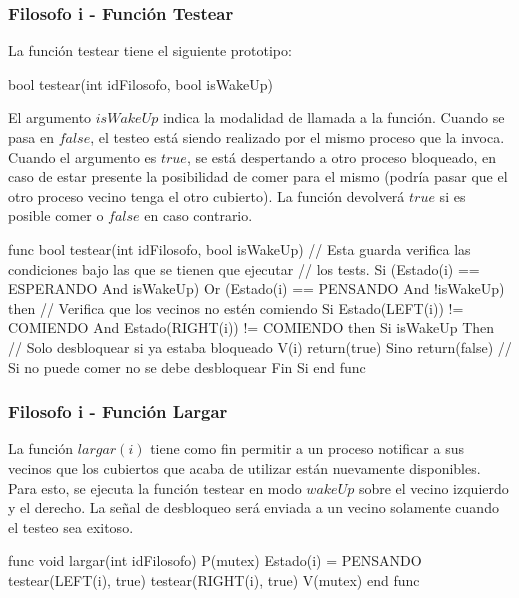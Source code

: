 \subsubsection{Filosofo i - Función Testear}
La función testear tiene el siguiente prototipo:

\begin{scriptsize} 
\begin{verbatimtab} 
	bool testear(int idFilosofo, bool isWakeUp) 
\end{verbatimtab}
\end{scriptsize}

El argumento $isWakeUp$ indica la modalidad de llamada a la función. Cuando se pasa en $false$, 
el testeo está siendo realizado por el mismo proceso que la invoca. Cuando el argumento es $true$, se 
está despertando a otro proceso bloqueado, en caso de estar presente la posibilidad de comer 
para el mismo (podría pasar que el otro proceso vecino tenga el otro cubierto). 
La función devolverá $true$ si es posible comer o $false$ en caso contrario.

\begin{scriptsize} 
\begin{verbatimtab} 
	func bool testear(int idFilosofo, bool isWakeUp)
		// Esta guarda verifica las condiciones bajo las que se tienen que ejecutar
		// los tests. 
		Si (Estado(i) == ESPERANDO And isWakeUp) Or (Estado(i) == PENSANDO And !isWakeUp) then
			// Verifica que los vecinos no estén comiendo
			Si Estado(LEFT(i)) != COMIENDO And Estado(RIGHT(i)) != COMIENDO then
				Si isWakeUp Then	// Solo desbloquear si ya estaba bloqueado			
					V(i)
				return(true)		
			Sino
				return(false)		// Si no puede comer no se debe desbloquear
		Fin Si	
	end func
\end{verbatimtab}
\end{scriptsize}

\subsubsection{Filosofo i - Función Largar}
La función $largar(i)$ tiene como fin permitir a un proceso notificar a sus vecinos que los cubiertos 
que acaba de utilizar están nuevamente disponibles. Para esto, se ejecuta la función testear 
en modo $wakeUp$ sobre el vecino izquierdo y el derecho.  La señal de desbloqueo será enviada a 
un vecino solamente cuando el testeo sea exitoso.

\begin{scriptsize} 
\begin{verbatimtab} 
	func void largar(int idFilosofo)
		P(mutex)
		Estado(i) = PENSANDO
		testear(LEFT(i), true)
		testear(RIGHT(i), true)
		V(mutex)
	end func
\end{verbatimtab}
\end{scriptsize}

